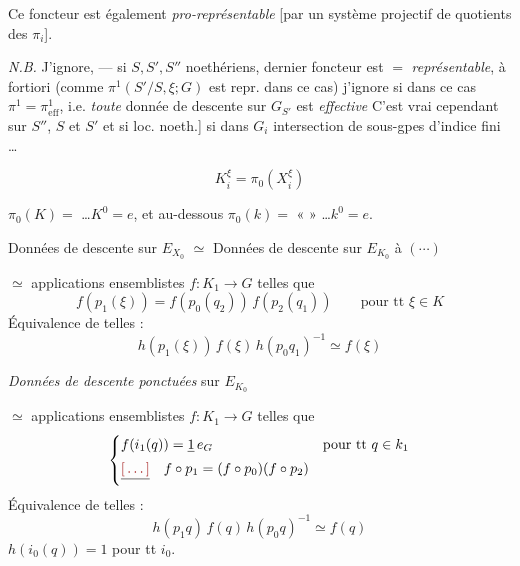 \documentclass[11pt,a4paper]{article}
\begin{document}
Ce foncteur est également \emph{pro-représentable} [par un système projectif de
quotients des $\pi_i$].

\emph{N.B.} J'ignore, --- si $S,S',S''$ noethériens, \ill{} dernier foncteur
est $=$ \emph{représentable}, à fortiori (comme $\pi^1(S'/S,\xi;G)$ est repr.
dans ce cas) j'ignore si dans ce cas $\pi^1 = \pi^1_{\mathrm{eff}}$, i.e.
\emph{toute} donnée de descente sur $G_{S'}$ est \emph{effective} \ill{}
C'est vrai cependant \struck{\ill{}}  sur $S''$, $S$ et
$S'$ \ill{} et si loc. noeth.] si \struck{\ill{}} dans $G_i$ \ill{}
intersection de sous-gpes \ill{} d'indice fini \ldots




\[
  K_i^{\xi} = \pi_0(X_i^{\xi})
\]

$\pi_0(K) = {}$ \ill{} \ldots $K^0 = e$, et au-dessous
$\pi_0(k) = {}$ « \ill{} » \ldots $k^0 = e$.


Données de descente sur $E_{X_0}$ $\simeq$ Données de descente sur $E_{K_0}$
 à $(\cdots)$

$\simeq$ applications \struck{\ill{}} ensemblistes $f : K_1 \to G$ telles que
\[
  f(p_1(\xi)) = f(p_0(q_2))\, f(p_2(q_1)) \qquad \text{pour tt } \xi \in K
\]
Équivalence de telles :
\[
  h(p_1(\xi))\, f(\xi)\, h(p_0 q_1)^{-1} \simeq f(\xi)
\]

\emph{Données de descente ponctuées} sur $E_{K_0}$

$\simeq$ applications ensemblistes $f : K_1 \to G$ telles que
\[
  \begin{cases}
    f(i_1(q)) = \struck{1}\, e_G & \text{pour tt } q \in k_1 \\
    \struck{\ill{}}\quad f \circ p_1 = (f \circ p_0)(f \circ p_2) &
  \end{cases}
\]
Équivalence de telles :
\[
  h(p_1 q)\, f(q)\, h(p_0 q)^{-1} \simeq f(q)
\]
 $h(i_0(q)) = 1$ pour tt $i_0$.
\end{document}
